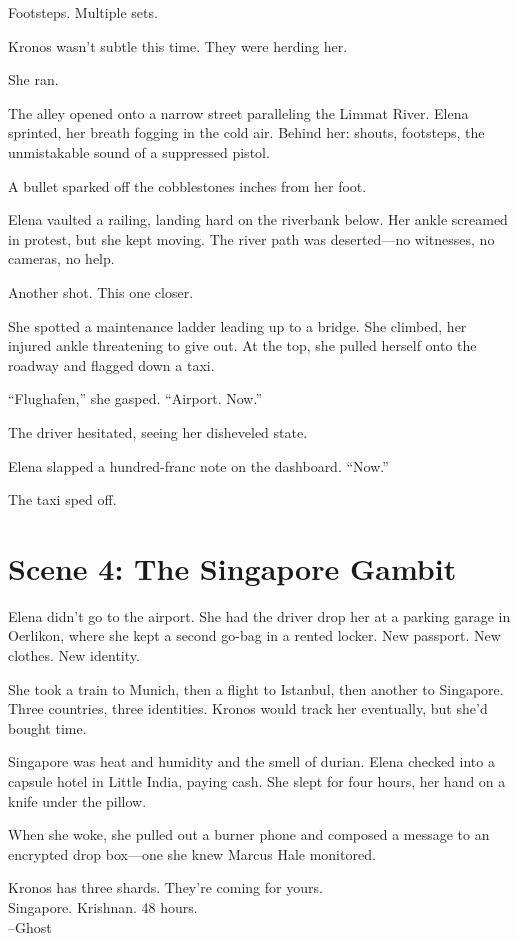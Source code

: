 \documentclass[12pt,oneside]{book}
\begin{document}
Footsteps. Multiple sets.

Kronos wasn't subtle this time. They were herding her.

She ran.

The alley opened onto a narrow street paralleling the Limmat River. Elena sprinted, her breath fogging in the cold air. Behind her: shouts, footsteps, the unmistakable sound of a suppressed pistol.

A bullet sparked off the cobblestones inches from her foot.

Elena vaulted a railing, landing hard on the riverbank below. Her ankle screamed in protest, but she kept moving. The river path was deserted—no witnesses, no cameras, no help.

Another shot. This one closer.

She spotted a maintenance ladder leading up to a bridge. She climbed, her injured ankle threatening to give out. At the top, she pulled herself onto the roadway and flagged down a taxi.

``Flughafen,'' she gasped. ``Airport. Now.''

The driver hesitated, seeing her disheveled state.

Elena slapped a hundred-franc note on the dashboard. ``Now.''

The taxi sped off.

\section*{Scene 4: The Singapore Gambit}

Elena didn't go to the airport. She had the driver drop her at a parking garage in Oerlikon, where she kept a second go-bag in a rented locker. New passport. New clothes. New identity.

She took a train to Munich, then a flight to Istanbul, then another to Singapore. Three countries, three identities. Kronos would track her eventually, but she'd bought time.

Singapore was heat and humidity and the smell of durian. Elena checked into a capsule hotel in Little India, paying cash. She slept for four hours, her hand on a knife under the pillow.

When she woke, she pulled out a burner phone and composed a message to an encrypted drop box—one she knew Marcus Hale monitored.

\begin{terminalbox}
Kronos has three shards. They're coming for yours.\\
Singapore. Krishnan. 48 hours.\\
--Ghost
\end{terminalbox}
\end{document}

